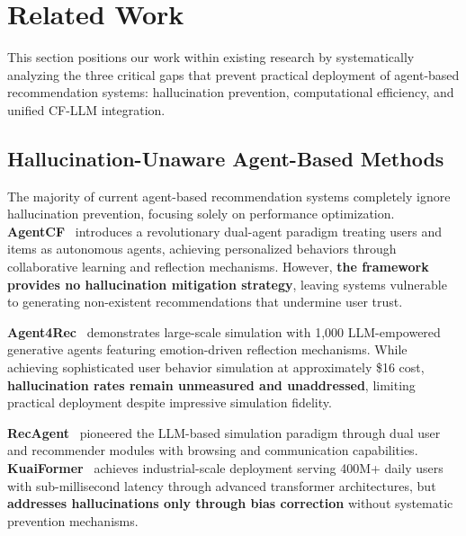 \documentclass[acmsmall]{acmart}
\begin{document}
\section{Related Work}

This section positions our work within existing research by systematically analyzing the three critical gaps that prevent practical deployment of agent-based recommendation systems: hallucination prevention, computational efficiency, and unified CF-LLM integration.

\subsection{Hallucination-Unaware Agent-Based Methods}

The majority of current agent-based recommendation systems completely ignore hallucination prevention, focusing solely on performance optimization. \textbf{AgentCF}~\cite{zhang2024agentcf} introduces a revolutionary dual-agent paradigm treating users and items as autonomous agents, achieving personalized behaviors through collaborative learning and reflection mechanisms. However, \textbf{the framework provides no hallucination mitigation strategy}, leaving systems vulnerable to generating non-existent recommendations that undermine user trust.

\textbf{Agent4Rec}~\cite{zhang2024generative} demonstrates large-scale simulation with 1,000 LLM-empowered generative agents featuring emotion-driven reflection mechanisms. While achieving sophisticated user behavior simulation at approximately \$16 cost, \textbf{hallucination rates remain unmeasured and unaddressed}, limiting practical deployment despite impressive simulation fidelity.

\textbf{RecAgent}~\cite{wang2025user} pioneered the LLM-based simulation paradigm through dual user and recommender modules with browsing and communication capabilities. \textbf{KuaiFormer}~\cite{kuaiformer2024} achieves industrial-scale deployment serving 400M+ daily users with sub-millisecond latency through advanced transformer architectures, but \textbf{addresses hallucinations only through bias correction} without systematic prevention mechanisms.
\end{document}

